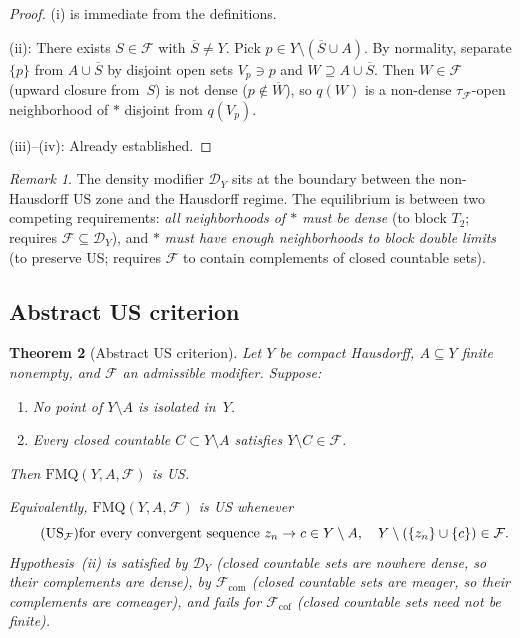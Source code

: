 \documentclass[11pt]{article}
\newtheorem{theorem}{Theorem}[section]
\theoremstyle{definition}
\theoremstyle{remark}
\newtheorem{remark}[theorem]{Remark}
\begin{document}
\begin{proof}
(i) is immediate from the definitions.

(ii): There exists $S \in \mathcal{F}$ with
$\overline{S} \neq Y$. Pick
$p \in Y \setminus (\overline{S} \cup A)$.
By normality,
separate $\{p\}$ from $A \cup \overline{S}$ by disjoint open sets $V_p \ni p$
and $W \supseteq A \cup \overline{S}$. Then $W \in \mathcal{F}$ (upward closure from~$S$)
is not dense ($p \notin \overline{W}$), so $q(W)$ is a non-dense $\tau_{\mathcal{F}}$-open
neighborhood of $\ast$ disjoint from $q(V_p)$.

(iii)--(iv): Already established.
\end{proof}

\begin{remark}\label{rem:densityboundary}
The density modifier $\mathcal{D}_Y$ sits at the boundary between
the non-Hausdorff US zone and the Hausdorff regime. The equilibrium is
between two competing requirements:
\emph{all neighborhoods of $\ast$ must be dense} (to block $T_2$;
requires $\mathcal{F} \subseteq \mathcal{D}_Y$), and
$\ast$ \emph{must have enough neighborhoods to block double limits}
(to preserve US; requires $\mathcal{F}$ to contain complements of
closed countable sets).
\end{remark}

\subsection{Abstract US criterion}\label{sec:convergence}

\begin{theorem}[Abstract US criterion]\label{thm:abstractUS}
Let $Y$ be compact Hausdorff, $A \subseteq Y$ finite nonempty, and $\mathcal{F}$ an
admissible modifier.  Suppose:
\begin{enumerate}[label=\textup{(\roman*)},nosep]
\item No point of $Y \setminus A$ is isolated in~$Y$.
\item Every closed countable $C \subset Y \setminus A$ satisfies
$Y \setminus C \in \mathcal{F}$.
\end{enumerate}
Then $\mathrm{FMQ}(Y, A, \mathcal{F})$ is US.

Equivalently, $\mathrm{FMQ}(Y, A, \mathcal{F})$ is US whenever
\begin{equation}\tag{US$_{\mathcal{F}}$}
\text{for every convergent sequence } z_n \to c \in Y \setminus A, \quad
Y \setminus (\{z_n\} \cup \{c\}) \in \mathcal{F}.
\end{equation}
Hypothesis~\textup{(ii)} is satisfied by $\mathcal{D}_Y$
(closed countable sets are nowhere dense, so their complements are dense),
by $\mathcal{F}_{\mathrm{com}}$ (closed countable sets are meager, so
their complements are comeager), and fails for $\mathcal{F}_{\mathrm{cof}}$
(closed countable sets need not be finite).
\end{theorem}
\end{document}
